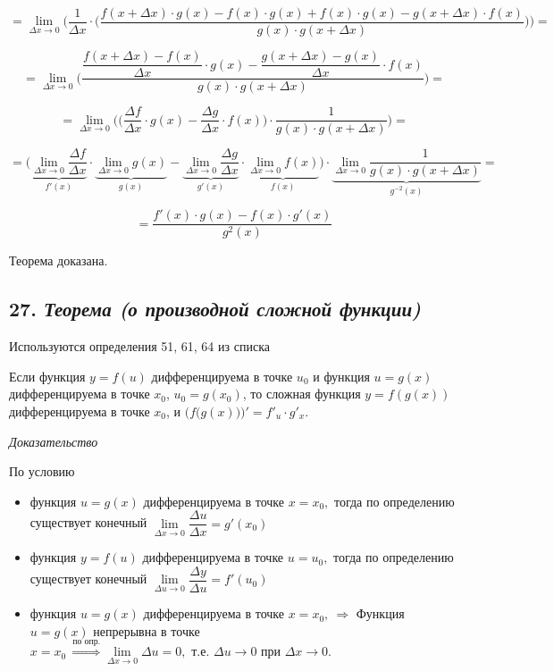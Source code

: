 $$
=\lim\limits_{\Delta x \rightarrow 0}\Bigg( \dfrac{1}{\Delta x}\cdot\bigg({\dfrac{f(x + \Delta x)\cdot g(x) - f(x)\cdot g(x) + f(x)\cdot g(x) -g(x + \Delta x)\cdot f(x)}{g(x)\cdot g(x + \Delta x)}}\bigg)\Bigg) 
=
$$

$$
=\lim\limits_{\Delta x \rightarrow 0}\Bigg( {\dfrac{{\dfrac{f(x + \Delta x) - f(x)}{\Delta x}}\cdot g(x) -  {\dfrac{g(x + \Delta x) - g(x)}{\Delta x}}\cdot f(x)}{g(x)\cdot g(x + \Delta x)}}\Bigg) 
=
$$

$$
=\lim\limits_{\Delta x \rightarrow 0}\Bigg(\bigg({\dfrac{\Delta f}{\Delta x}}\cdot g(x) -  {\dfrac{\Delta g}{\Delta x}}\cdot f(x)\bigg)\cdot\dfrac{1}{g(x)\cdot g(x + \Delta x)}\Bigg) =
$$

$$
=\Bigg(\underbrace{\lim\limits_{\Delta x \rightarrow 0}{\dfrac{\Delta f}{\Delta x}}}_{f'(x)}\cdot \underbrace{\lim\limits_{\Delta x \rightarrow 0}g(x)}_{g(x)} -  \underbrace{\lim\limits_{\Delta x \rightarrow 0}{\dfrac{\Delta g}{\Delta x}}}_{g'(x)}\cdot \underbrace{\lim\limits_{\Delta x \rightarrow 0}f(x)}_{f(x)}\Bigg)\cdot\underbrace{\lim\limits_{\Delta x \rightarrow 0}\dfrac{1}{g(x)\cdot g(x + \Delta x)}}_{g^{-2}(x)}=
$$

$$
= {\dfrac{f'(x)\cdot g(x) - f(x)\cdot g'(x)}{g^2(x)}}
$$

Теорема доказана.
\newpage 
\subsection*{27. \textit{Теорема (о производной сложной функции)}}
\begin{Quote2} 
\small\centering 

Используются определения 51, 61, 64 из списка \end{Quote2} 

Если функция $y=f(u)$ дифференцируема в точке $u_0$ и функция $u = g(x)$ дифференцируема в точке $x_0$, $u_0 = g(x_0)$, то сложная функция $y = f(g(x))$ дифференцируема в точке $x_0$, и $\Big(f\big(g(x)\big)\Big)' = f'_u\cdot g'_x$.
\vspace*{20pt} 

\textit{Доказательство}

По условию
\begin{itemize}

\item функция $u = g(x)$ дифференцируема в точке $x = x_0,$ тогда по определению существует конечный $\lim\limits_{\Delta x\rightarrow 0}{\dfrac{\Delta u}{\Delta x}} = g'(x_0)$
\item функция $y = f(u)$ дифференцируема в точке $u = u_0,$ тогда по определению существует конечный $\lim\limits_{\Delta u\rightarrow 0}{\dfrac{\Delta y}{\Delta u}} = f'(u_0)$
\item функция $u = g(x)$ дифференцируема в точке $x = x_0, \ \Rightarrow$ Функция $u = g(x)$ непрерывна в точке $x = x_0 \ \overset{\text{по опр.}}{\Rightarrow} \lim\limits_{\Delta x \rightarrow 0}\Delta u = 0, \text{ т.е. } \Delta u \rightarrow 0 \text{ при } \Delta x \rightarrow 0$.

\end{itemize}

